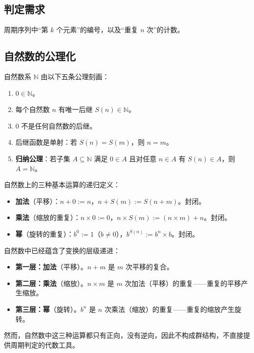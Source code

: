 \subsection{\texorpdfstring{判定需求}{判定需求}}

周期序列中“第 $k$ 个元素”的编号，以及“重复 $n$ 次”的计数。

\subsection{\texorpdfstring{自然数的公理化}{自然数的公理化}}

\begin{axiom}[皮亚诺算术]\label{ax:peano}
自然数系 $\mathbb{N}$ 由以下五条公理刻画：
\begin{enumerate}[label=(\arabic*)]
    \item $0 \in \mathbb{N}$。
    \item 每个自然数 $n$ 有唯一后继 $S(n) \in \mathbb{N}$。
    \item $0$ 不是任何自然数的后继。
    \item 后继函数是单射：若 $S(n) = S(m)$，则 $n = m$。
    \item \textbf{归纳公理}：若子集 $A \subseteq \mathbb{N}$ 满足 $0 \in A$ 且对任意 $n \in A$ 有 $S(n) \in A$，则 $A = \mathbb{N}$。
\end{enumerate}
\end{axiom}

\begin{definition}[自然数上的运算]\label{def:nat_operations}
自然数上的三种基本运算的递归定义：
\begin{itemize}
    \item \textbf{加法}（平移）：$n + 0 := n$，$n + S(m) := S(n + m)$。封闭。
    \item \textbf{乘法}（缩放的重复）：$n \times 0 := 0$，$n \times S(m) := (n \times m) + n$。封闭。
    \item \textbf{幂}（旋转的重复）：$b^0 := 1$（$b \neq 0$），$b^{S(n)} := b^n \times b$。封闭。
\end{itemize}
\end{definition}

\begin{remark}[变换层级在自然数中的体现]\label{rem:nat_hierarchy}
自然数中已经蕴含了变换的层级递进：
\begin{itemize}
    \item \textbf{第一层：加法}（平移）。$n + m$ 是 $m$ 次平移的复合。
    \item \textbf{第二层：乘法}（缩放）。$n \times m$ 是 $m$ 次加法（平移）的重复——重复的平移产生缩放。
    \item \textbf{第三层：幂}（旋转）。$b^n$ 是 $n$ 次乘法（缩放）的重复——重复的缩放产生旋转。
\end{itemize}
然而，自然数中这三种运算都只有正向，没有逆向，因此不构成群结构，不直接提供周期判定的代数工具。
\end{remark}

